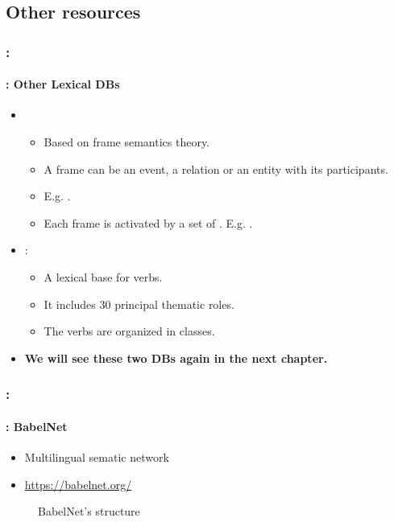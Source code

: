 \documentclass[xcolor=table]{beamer}
\begin{document}
\subsection{Other resources}

\begin{frame}
	\frametitle{\insertshortsubtitle: \insertsection}
	\framesubtitle{\insertsubsection: Other Lexical DBs}
	
	\begin{itemize}
		\item {} 
		\begin{itemize}
			\item Based on frame semantics theory.
			\item A frame can be an event, a relation or an entity with its participants.
			\item E.g. .
			\item Each frame is activated by a set of . E.g. .
		\end{itemize}
		\item {}:
		\begin{itemize}
			\item A lexical base for verbs.
			\item It includes 30 principal thematic roles.
			\item The verbs are organized in classes.
		\end{itemize}
		\item \textbf{We will see these two DBs again in the next chapter.}
	\end{itemize}
	
\end{frame}

\begin{frame}
	\frametitle{\insertshortsubtitle: \insertsection}
	\framesubtitle{\insertsubsection: BabelNet}

	\begin{itemize}
		\item Multilingual sematic network
		\item \url{https://babelnet.org/}
	\end{itemize}
	
	\begin{figure}
		\caption{BabelNet's structure \cite{2012-navigli-ponzetto}}
	\end{figure}
	
\end{frame}
\end{document}

